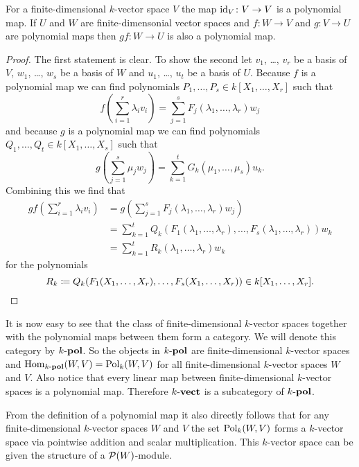 \begin{lem}
 For a finite-dimensional $k$-vector space $V$ the map $\operatorname{id}_V \colon V \to V$ is a polynomial map. If $U$ and $W$ are finite-dimensonial vector spaces and $f \colon W \to V$ and $g \colon V \to U$ are polynomial maps then $gf \colon W \to U$ is also a polynomial map.
\end{lem}
\begin{proof}
 The first statement is clear. To show the second let $v_1$, \dots, $v_r$ be a basis of $V$, $w_1$, \dots, $w_s$ be a basis of $W$ and $u_1$, \dots, $u_t$ be a basis of $U$. Because $f$ is a polynomial map we can find polynomials $P_1, \dotsc, P_s \in k[X_1, \dotsc, X_r]$ such that
 \[
  f\left(\sum_{i=1}^r \lambda_i v_i\right) = \sum_{j=1}^s F_j(\lambda_1, \dotsc, \lambda_r) w_j
 \]
 and because $g$ is a polynomial map we can find polynomials $Q_1, \dotsc, Q_t \in k[X_1, \dotsc, X_s]$ such that
 \[
  g\left(\sum_{j=1}^s \mu_j w_j\right) = \sum_{k=1}^t G_k(\mu_1, \dotsc, \mu_s) u_k.
 \]
 Combining this we find that
 \begin{align*}
  gf\left(\sum_{i=1}^r \lambda_i v_i\right)
  &= g\left(\sum_{j=1}^s F_j(\lambda_1, \dotsc, \lambda_r) w_j\right) \\
  &= \sum_{k=1}^t Q_k(F_1(\lambda_1, \dotsc, \lambda_r), \dotsc, F_s(\lambda_1, \dotsc, \lambda_r)) w_k \\
  &= \sum_{k=1}^t R_k(\lambda_1, \dotsc, \lambda_r) w_k
 \end{align*}
 for the polynomials
 \[
  R_k \coloneqq Q_k(F_1(X_1, \dotsc, X_r), \dotsc, F_s(X_1, \dotsc, X_r)) \in k[X_1, \dotsc, X_r].
  \qedhere
 \]
\end{proof}


It is now easy to see that the class of finite-dimensional $k$-vector spaces together with the polynomial maps between them form a category. We will denote this category by $k\text{-}\mathbf{pol}$. So the objects in $k\text{-}\mathbf{pol}$ are finite-dimensional $k$-vector spaces and $\operatorname{Hom}_{k\text{-}\mathbf{pol}}(W,V) = \operatorname{Pol}_k(W,V)$ for all finite-dimensional $k$-vector spaces $W$ and $V$. Also notice that every linear map between finite-dimensional $k$-vector spaces is a polynomial map. Therefore $k\text{-}\mathbf{vect}$ is a subcategory of $k\text{-}\mathbf{pol}$.

From the definition of a polynomial map it also directly follows that for any finite-dimensional $k$-vector spaces $W$ and $V$ the set $\operatorname{Pol}_k(W,V)$ forms a $k$-vector space via pointwise addition and scalar multiplication. This $k$-vector space can be given the structure of a $\mathcal{P}(W)$-module.

